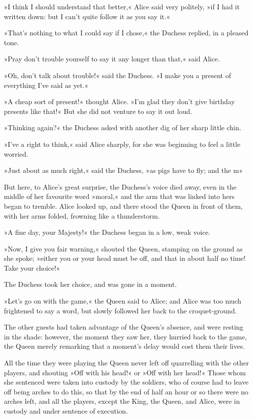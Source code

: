 »I think I should understand that better,« Alice said very politely, »if I had it written down: but I can't quite follow it as you say it.«

»That's nothing to what I could say if I chose,« the Duchess replied, in a pleased tone.

»Pray don't trouble yourself to say it any longer than that,« said Alice.

»Oh, don't talk about trouble!« said the Duchess. »I make you a present of everything I've said as yet.«

»A cheap sort of present!« thought Alice. »I'm glad they don't give birthday presents like that!« But she did not venture to say it out loud.

»Thinking again?« the Duchess asked with another dig of her sharp little chin.

»I've a right to think,« said Alice sharply, for she was beginning to feel a little worried.

»Just about as much right,« said the Duchess, »as pigs have to fly; and the m\longdash«

But here, to Alice's great surprise, the Duchess's voice died away, even in the middle of her favourite word »moral,« and the arm that was linked into hers began to tremble. Alice looked up, and there stood the Queen in front of them, with her arms folded, frowning like a thunderstorm.

»A fine day, your Majesty!« the Duchess began in a low, weak voice.

»Now, I give you fair warning,« shouted the Queen, stamping on the ground as she spoke; »either you or your head must be off, and that in about half no time! Take your choice!«

The Duchess took her choice, and was gone in a moment.

»Let's go on with the game,« the Queen said to Alice; and Alice was too much frightened to say a word, but slowly followed her back to the croquet-ground.

The other guests had taken advantage of the Queen's absence, and were resting in the shade: however, the moment they saw her, they hurried back to the game, the Queen merely remarking that a moment's delay would cost them their lives.


All the time they were playing the Queen never left off quarrelling with the other players, and shouting »Off with his head!« or »Off with her head!« Those whom she sentenced were taken into custody by the soldiers, who of course had to leave off being arches to do this, so that by the end of half an hour or so there were no arches left, and all the players, except the King, the Queen, and Alice, were in custody and under sentence of execution.

